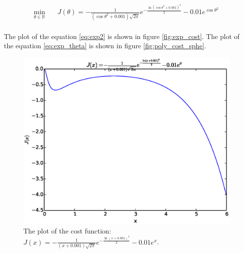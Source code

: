 \documentclass[a4paper,12pt]{article}
\begin{document}
\begin{equation}\label{eq:exp_theta}
\begin{aligned}
\min_{\theta\in \mathbb{R}} \quad &J(\theta)=-\frac{1}{(\cos \theta ^2+0.001) \sqrt{2 \pi}}e^{-\frac{\ln(\cos \theta ^2+0.001)^2}{2} }-0.01 e^{\cos \theta ^2}\\
\end{aligned}
\end{equation}

The plot of the equation \ref{eq:exp2} is shown in figure \ref{fig:exp_cost}.  The plot of the equation \ref{eq:exp_theta} is shown in figure \ref{fig:poly_cost_sphe}.\\  


\begin{figure}[H]
\begin{center}
\includegraphics[width=1.0\linewidth]{exponential.eps}


\end{center}
   \caption{The plot of the cost function: $J(x) =-\frac{1}{(x+0.001) \sqrt{2 \pi}}e^{-\frac{\ln(x+0.001)^2}{2} }-0.01 e^x$. }
\label{fig:exp_cost_sphe}
\end{figure}
\end{document}
